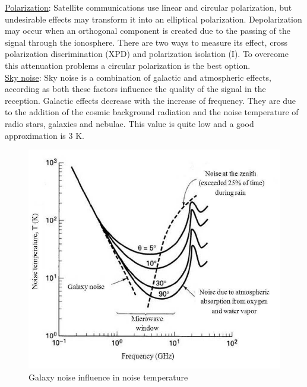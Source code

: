 \underline{Polarization}: Satellite communications use linear and circular polarization, but undesirable effects may transform it into an elliptical polarization. Depolarization may occur when an orthogonal component is created due to the passing of the signal through the ionosphere. There are two ways to measure its effect, cross polarization discrimination (XPD) and polarization isolation (I)\cite{Jorge2012}. To overcome this attenuation problems a circular polarization is the best option.\\

\underline{Sky noise}: Sky noise is a combination of galactic and atmospheric effects, according as both these factors influence the quality of the signal in the reception. Galactic effects decrease with the increase of frequency. They are due to the addition of the cosmic background radiation and the noise temperature of radio stars, galaxies and nebulae. This value is quite low and a good approximation is 3 K.
\begin{figure}[h]
	\includegraphics[scale=0.5]{./sections/SatelliteDesign/images/NoiseTemperature}
	\centering
	\caption{Galaxy noise influence in noise temperature \cite{Jorge2012}}
	\label{NoiseTemperature}
\end{figure}
